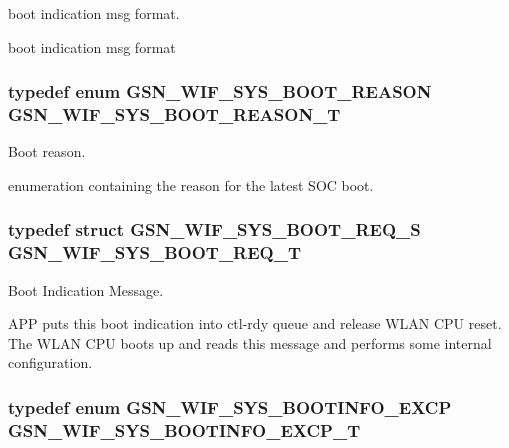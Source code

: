 boot indication msg format. 

boot indication msg format \hypertarget{a00639_ga213ad232655e90fd6ca561d772ef7b96}{
\subsubsection[{GSN\_\-WIF\_\-SYS\_\-BOOT\_\-REASON\_\-T}]{\setlength{\rightskip}{0pt plus 5cm}typedef enum {\bf GSN\_\-WIF\_\-SYS\_\-BOOT\_\-REASON}  {\bf GSN\_\-WIF\_\-SYS\_\-BOOT\_\-REASON\_\-T}}}
\label{a00639_ga213ad232655e90fd6ca561d772ef7b96}


Boot reason. 

enumeration containing the reason for the latest SOC boot. \hypertarget{a00639_ga1d3de3e01c42d56351a808bbea56786d}{
\subsubsection[{GSN\_\-WIF\_\-SYS\_\-BOOT\_\-REQ\_\-T}]{\setlength{\rightskip}{0pt plus 5cm}typedef struct {\bf GSN\_\-WIF\_\-SYS\_\-BOOT\_\-REQ\_\-S}  {\bf GSN\_\-WIF\_\-SYS\_\-BOOT\_\-REQ\_\-T}}}
\label{a00639_ga1d3de3e01c42d56351a808bbea56786d}


Boot Indication Message. 

APP puts this boot indication into ctl-\/rdy queue and release WLAN CPU reset. The WLAN CPU boots up and reads this message and performs some internal configuration. \hypertarget{a00639_ga908aa6facf38cbcd28fae2a91d83d4e7}{
\subsubsection[{GSN\_\-WIF\_\-SYS\_\-BOOTINFO\_\-EXCP\_\-T}]{\setlength{\rightskip}{0pt plus 5cm}typedef enum {\bf GSN\_\-WIF\_\-SYS\_\-BOOTINFO\_\-EXCP}  {\bf GSN\_\-WIF\_\-SYS\_\-BOOTINFO\_\-EXCP\_\-T}}}
\label{a00639_ga908aa6facf38cbcd28fae2a91d83d4e7}


